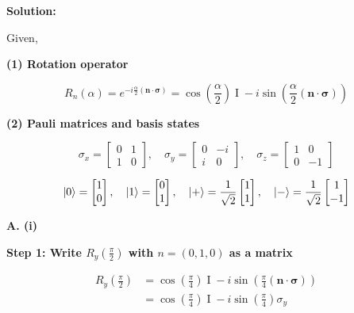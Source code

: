 \documentclass[11pt]{article}
\newenvironment{solution}
{\par\noindent\textbf{Solution:}\par}
{\vspace{1em}}
\begin{document}
\begin{solution}

Given,

\textbf{(1) Rotation operator}

\[R_n(\alpha) = e^{-i\frac{\alpha}{2}(\boldsymbol{n} \cdot \boldsymbol{\sigma})} = \cos(\frac{\alpha}{2})\operatorname{I} -i\sin(\frac{\alpha}{2}(\boldsymbol{n} \cdot \boldsymbol{\sigma}))\]

\textbf{(2) Pauli matrices and basis states}

\[\sigma_x = \begin{bmatrix}0 & 1 \\ 1 & 0\end{bmatrix}, \quad \sigma_y = \begin{bmatrix}0 & -i \\ i & 0\end{bmatrix}, \quad \sigma_z = \begin{bmatrix}1 & 0 \\ 0 & -1\end{bmatrix}\]

\[\ket{0} = \begin{bmatrix}1 \\ 0\end{bmatrix}, \quad \ket{1} = \begin{bmatrix}0 \\ 1\end{bmatrix}, \quad \ket{+} = \frac{1}{\sqrt{2}}\begin{bmatrix}1 \\ 1\end{bmatrix}, \quad \ket{-} = \frac{1}{\sqrt{2}}\begin{bmatrix}1 \\ -1\end{bmatrix}\]

\textbf{A. (i)}

\textbf{Step 1: Write $R_y(\frac{\pi}{2})$ with $n = (0,1,0)$ as a matrix}

\[\begin{aligned}
R_y(\frac{\pi}{2}) &= \cos(\frac{\pi}{4})\operatorname{I} - i\sin(\frac{\pi}{4}(\boldsymbol{n} \cdot \boldsymbol{\sigma})) \\
&= \cos(\frac{\pi}{4})\operatorname{I} - i\sin(\frac{\pi}{4})\sigma_y
\end{aligned}\]


\end{solution}
\end{document}
